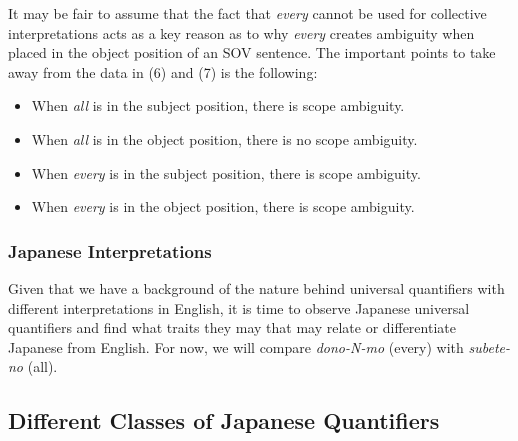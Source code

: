 \documentclass[english, 11pt]{article}
\begin{document}
\newline
It may be fair to assume that the fact that \emph{every} cannot be used for collective interpretations acts as a key reason as to why \emph{every} creates ambiguity when placed in the object position of an SOV sentence. The important points to take away from the data in (6) and (7) is the following:
\begin{itemize}
	\item When \emph{all} is in the subject position, there is scope ambiguity.
	\item When \emph{all} is in the object position, there is no scope ambiguity.
	\item When \emph{every} is in the subject position, there is scope ambiguity.
	\item When \emph{every} is in the object position, there is scope ambiguity.
\end{itemize}

\subsubsection{Japanese Interpretations}
Given that we have a background of the nature behind universal quantifiers with different interpretations in English, it is time to observe Japanese universal quantifiers and find what traits they may that may relate or differentiate Japanese from English. For now, we will compare \emph{dono-N-mo} (every) with \emph{subete-no} (all).

\begin{exe}
	\ex 
	\begin{xlist}
		\label{1a}
		\label{1b}
	\end{xlist}
\end{exe}


\subsection{Different Classes of Japanese Quantifiers}
\end{document}
